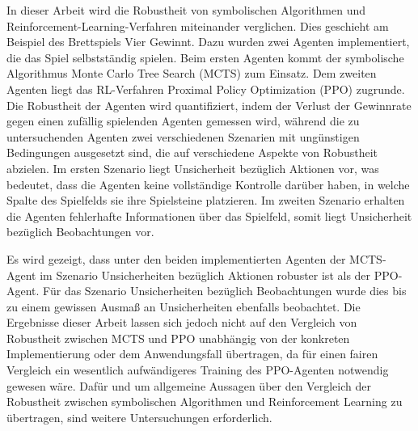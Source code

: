 In dieser Arbeit wird die Robustheit von symbolischen Algorithmen und Reinforcement-Learning-Verfahren miteinander verglichen. Dies geschieht am Beispiel des Brettspiels Vier Gewinnt. Dazu wurden zwei Agenten implementiert, die das Spiel selbstständig spielen. Beim ersten Agenten kommt der symbolische Algorithmus Monte Carlo Tree Search (MCTS) zum Einsatz. Dem zweiten Agenten liegt das RL-Verfahren Proximal Policy Optimization (PPO) zugrunde. Die Robustheit der Agenten wird quantifiziert, indem der Verlust der Gewinnrate gegen einen zufällig spielenden Agenten gemessen wird, während die zu untersuchenden Agenten zwei verschiedenen Szenarien mit ungünstigen Bedingungen ausgesetzt sind, die auf verschiedene Aspekte von Robustheit abzielen. Im ersten Szenario liegt Unsicherheit bezüglich Aktionen vor, was bedeutet, dass die Agenten keine vollständige Kontrolle darüber haben, in welche Spalte des Spielfelds sie ihre Spielsteine platzieren. Im zweiten Szenario erhalten die Agenten fehlerhafte Informationen über das Spielfeld, somit liegt Unsicherheit bezüglich Beobachtungen vor.

Es wird gezeigt, dass unter den beiden implementierten Agenten der MCTS-Agent im Szenario Unsicherheiten bezüglich Aktionen robuster ist als der PPO-Agent. Für das Szenario Unsicherheiten bezüglich Beobachtungen wurde dies bis zu einem gewissen Ausmaß an Unsicherheiten ebenfalls beobachtet. Die Ergebnisse dieser Arbeit lassen sich jedoch nicht auf den Vergleich von Robustheit zwischen MCTS und PPO unabhängig von der konkreten Implementierung oder dem Anwendungsfall übertragen, da für einen fairen Vergleich ein wesentlich aufwändigeres Training des PPO-Agenten notwendig gewesen wäre. Dafür und um allgemeine Aussagen über den Vergleich der Robustheit zwischen symbolischen Algorithmen und Reinforcement Learning zu übertragen, sind weitere Untersuchungen erforderlich.

\newpage